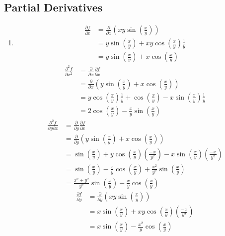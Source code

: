 
\subsection{Partial Derivatives}

\BEN

\item  {}
\begin{enumerate}

 \item
  \begin{align*}
   \frac{\partial f}{\partial x}
   &= \frac{\partial}{\partial x}(xy \sin(\frac{x}{y})) \\
   &= y\sin(\frac{x}{y}) + xy\cos(\frac{x}{y})\frac{1}{y} \\
   &= y\sin(\frac{x}{y}) + x\cos(\frac{x}{y})
  \end{align*}
 \begin{align*}
   \frac{\partial^2 f}{\partial x^2}
   &= \frac{\partial}{\partial x}\frac{\partial f}{\partial x} \\
   &= \frac{\partial}{\partial x}(y\sin(\frac{x}{y}) + x\cos(\frac{x}{y})) \\
   &= y\cos(\frac{x}{y})\frac{1}{y} + \cos(\frac{x}{y}) - x\sin(\frac{x}{y})\frac{1}{y} \\
   &= 2\cos(\frac{x}{y}) - \frac{x}{y}\sin(\frac{x}{y})
 \end{align*}
 \begin{align*}
  \frac{\partial^2 f}{\partial y \partial x}
   &= \frac{\partial}{\partial y}\frac{\partial f}{\partial x} \\
   &= \frac{\partial}{\partial y}(y\sin(\frac{x}{y}) + x\cos(\frac{x}{y})) \\
   &= \sin(\frac{x}{y}) + y\cos(\frac{x}{y})(\frac{-x}{y^2}) - x\sin(\frac{x}{y})(\frac{-x}{y^2}) \\
   &= \sin(\frac{x}{y}) - \frac{x}{y}\cos(\frac{x}{y}) + \frac{x^2}{y^2}\sin(\frac{x}{y}) \\
   &= \frac{x^2+y^2}{y^2}\sin(\frac{x}{y}) - \frac{x}{y}\cos(\frac{x}{y}) 
 \end{align*}
 \begin{align*}
   \frac{\partial f}{\partial y}
   &= \frac{\partial}{\partial y}(xy \sin(\frac{x}{y})) \\
   &= x\sin(\frac{x}{y}) + xy\cos(\frac{x}{y})(\frac{-x}{y^2}) \\
   &= x\sin(\frac{x}{y}) - \frac{x^2}{y}\cos(\frac{x}{y})

\end{align*}
\end{enumerate}
